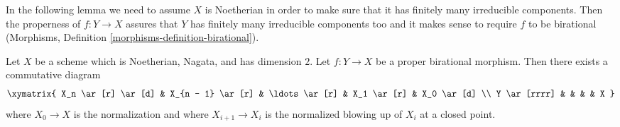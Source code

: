 \noindent
In the following lemma we need to assume $X$ is Noetherian in order
to make sure that it has finitely many irreducible components.
Then the properness of $f : Y \to X$ assures that $Y$ has finitely
many irreducible components too and it makes sense to require
$f$ to be birational
(Morphisms, Definition \ref{morphisms-definition-birational}).

\begin{lemma}
\label{lemma-dominate-by-normalized-blowing-up}
Let $X$ be a scheme which is Noetherian, Nagata, and has dimension $2$.
Let $f : Y \to X$ be a proper birational morphism.
Then there exists a commutative diagram
$$
\xymatrix{
X_n \ar[r] \ar[d] &
X_{n - 1} \ar[r] &
\ldots \ar[r] &
X_1 \ar[r] &
X_0 \ar[d] \\
Y \ar[rrrr]  & & & & X
}
$$
where $X_0 \to X$ is the normalization and
where $X_{i + 1} \to X_i$ is the normalized blowing up of $X_i$ at a closed
point.
\end{lemma}

